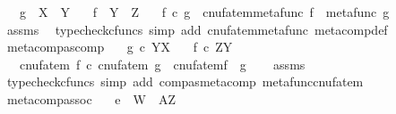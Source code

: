 \begin{isabellebody}
\ \ \ {\isachardoublequoteopen}g\ {\isacharcolon}{\kern0pt}\ X\ {\isasymrightarrow}\ Y{\isachardoublequoteclose}\isanewline
\ \ \ {\isachardoublequoteopen}f\ {\isacharcolon}{\kern0pt}\ Y\ {\isasymrightarrow}\ Z{\isachardoublequoteclose}\isanewline
\ \ \ {\isachardoublequoteopen}f\ {\isasymcirc}\isactrlsub c\ g\ {\isacharequal}{\kern0pt}\ cnufatem{\isacharparenleft}{\kern0pt}metafunc\ f\ {\isasymbox}\ metafunc\ g{\isacharparenright}{\kern0pt}{\isachardoublequoteclose}\isanewline
%
\isadelimproof
\ \ %
\endisadelimproof
%
\isatagproof
{}\isamarkupfalse%
\ assms\ \isamarkupfalse%
\ {\isacharparenleft}{\kern0pt}typecheck{\isacharunderscore}{\kern0pt}cfuncs{\isacharcomma}{\kern0pt}\ simp\ add{\isacharcolon}{\kern0pt}\ cnufatem{\isacharunderscore}{\kern0pt}metafunc\ meta{\isacharunderscore}{\kern0pt}comp{}{\isacharunderscore}{\kern0pt}def{}{\isacharparenright}{\kern0pt}%
\endisatagproof
{\isafoldproof}%
%
\isadelimproof
\isanewline
%
\endisadelimproof
\isanewline
{}\isamarkupfalse%
\ metacomp{\isacharunderscore}{\kern0pt}as{\isacharunderscore}{\kern0pt}comp{\isacharcolon}{\kern0pt}\isanewline
\ \ \ {\isachardoublequoteopen}g\ {\isasymin}\isactrlsub c\ Y\isactrlbsup X\isactrlesup {\isachardoublequoteclose}\isanewline
\ \ \ {\isachardoublequoteopen}f\ {\isasymin}\isactrlsub c\ Z\isactrlbsup Y\isactrlesup {\isachardoublequoteclose}\isanewline
\ \ \ {\isachardoublequoteopen}cnufatem\ f\ {\isasymcirc}\isactrlsub c\ cnufatem\ g\ {\isacharequal}{\kern0pt}\ cnufatem{\isacharparenleft}{\kern0pt}f\ {\isasymbox}\ g{\isacharparenright}{\kern0pt}{\isachardoublequoteclose}\isanewline
%
\isadelimproof
\ \ %
\endisadelimproof
%
\isatagproof
{}\isamarkupfalse%
\ assms\ \isamarkupfalse%
\ {\isacharparenleft}{\kern0pt}typecheck{\isacharunderscore}{\kern0pt}cfuncs{\isacharcomma}{\kern0pt}\ simp\ add{\isacharcolon}{\kern0pt}\ comp{\isacharunderscore}{\kern0pt}as{\isacharunderscore}{\kern0pt}metacomp\ metafunc{\isacharunderscore}{\kern0pt}cnufatem{\isacharparenright}{\kern0pt}%
\endisatagproof
{\isafoldproof}%
%
\isadelimproof
\isanewline
%
\endisadelimproof
\isanewline
{}\isamarkupfalse%
\ meta{\isacharunderscore}{\kern0pt}comp{\isacharunderscore}{\kern0pt}assoc{\isacharcolon}{\kern0pt}\isanewline
\ \ \ {\isachardoublequoteopen}e\ {\isacharcolon}{\kern0pt}\ W\ {\isasymrightarrow}\ A\isactrlbsup Z\isactrlesup {\isachardoublequoteclose}\isanewline

\end{isabellebody}
